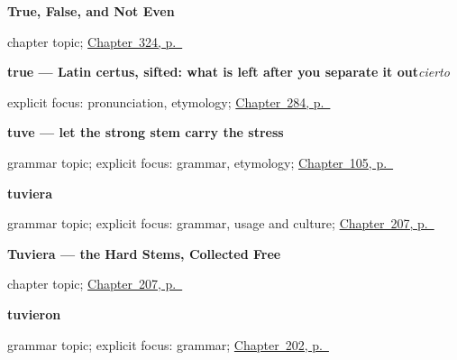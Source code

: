 \noindent\begin{minipage}[t]{\linewidth}
\raggedright
\textbf{True, False, and Not Even}\par
\footnotesize chapter topic; \hyperref[ch:verdad-y-siquiera]{Chapter~324, p.~\pageref*{ch:verdad-y-siquiera}}
\end{minipage}\par\smallskip

\noindent\begin{minipage}[t]{\linewidth}
\raggedright
\textbf{true — Latin certus, sifted: what is left after you separate it out}\enspace\emph{cierto}\par
\footnotesize explicit focus: pronunciation, etymology; \hyperref[ch:respuestas-cortas]{Chapter~284, p.~\pageref*{ch:respuestas-cortas}}
\end{minipage}\par\smallskip

\noindent\begin{minipage}[t]{\linewidth}
\raggedright
\textbf{tuve — let the strong stem carry the stress}\par
\footnotesize grammar topic; explicit focus: grammar, etymology; \hyperref[ch:spanish-preterito-fuerte]{Chapter~105, p.~\pageref*{ch:spanish-preterito-fuerte}}
\end{minipage}\par\smallskip

\noindent\begin{minipage}[t]{\linewidth}
\raggedright
\textbf{tuviera}\par
\footnotesize grammar topic; explicit focus: grammar, usage and culture; \hyperref[ch:tuviera]{Chapter~207, p.~\pageref*{ch:tuviera}}
\end{minipage}\par\smallskip

\noindent\begin{minipage}[t]{\linewidth}
\raggedright
\textbf{Tuviera --- the Hard Stems, Collected Free}\par
\footnotesize chapter topic; \hyperref[ch:tuviera]{Chapter~207, p.~\pageref*{ch:tuviera}}
\end{minipage}\par\smallskip

\noindent\begin{minipage}[t]{\linewidth}
\raggedright
\textbf{tuvieron}\par
\footnotesize grammar topic; explicit focus: grammar; \hyperref[ch:tuvieron]{Chapter~202, p.~\pageref*{ch:tuvieron}}
\end{minipage}\par\smallskip

